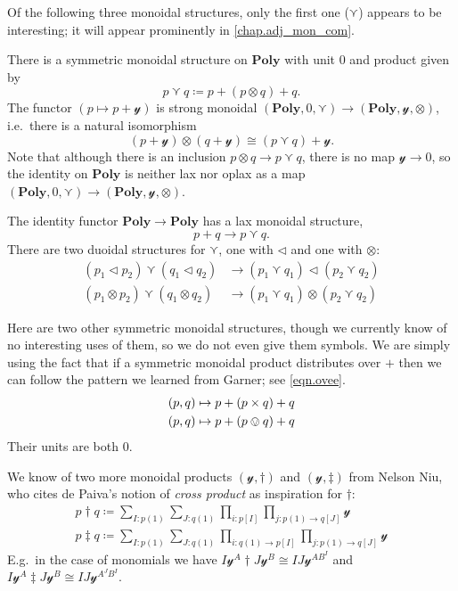 \documentclass[11pt, one side, article]{memoir}
\theoremstyle{definition}
\theoremstyle{plain}
\newcommand{\Cat}[1]{\mathbf{#1}}%
\newcommand{\yon}{{\mathcal{y}}}
\newcommand{\poly}{\Cat{Poly}}
\newcommand{\0}{\textsf{0}}
\newcommand{\1}{\tn{\textsf{1}}}
\newcommand{\tri}{\mathbin{\triangleleft}}
\newcommand{\OR}{\curlyvee}
\begin{document}
Of the following three monoidal structures, only the first one ($\OR$) appears to be interesting; it will appear prominently in \cref{chap.adj_mon_com}.

There is a symmetric monoidal structure on $\poly$ with unit $0$ and product given by
\begin{equation}\label{eqn.vee}
  p\OR q\coloneqq p+(p\otimes q)+q.
\end{equation}
The functor $(p\mapsto p+\yon)$ is strong monoidal $(\poly,0,\OR)\to(\poly,\yon,\otimes)$, i.e.\ there is a natural isomorphism
\begin{equation}
	(p+\yon)\otimes(q+\yon)\cong (p\OR q)+\yon.
\end{equation}
Note that although there is an inclusion $p\otimes q\to p\OR q$, there is no map $\yon\to0$, so the identity on $\poly$ is neither lax nor oplax as a map $(\poly,0,\OR)\to(\poly,\yon,\otimes)$.

The identity functor $\poly\to\poly$ has a lax monoidal structure,
\begin{equation}
	p+q\to p\OR q.
\end{equation}
There are two duoidal structures for $\OR$, one with $\tri$ and one with $\otimes$:
\begin{align*}
	(p_1\tri p_2)\OR(q_1\tri q_2)&\to(p_1\OR q_1)\tri(p_2\OR q_2)\\
	(p_1\otimes p_2)\OR(q_1\otimes q_2)&\to(p_1\OR q_1)\otimes(p_2\OR q_2)
\end{align*}

Here are two other symmetric monoidal structures, though we currently know of no interesting uses of them, so we do not even give them symbols. We are simply using the fact that if a symmetric monoidal product distributes over $+$ then we can follow the pattern we learned from Garner; see \eqref{eqn.ovee}.
\begin{align}
	(p,q)&\mapsto p+(p\times q)+q\\
	(p,q)&\mapsto p+(p\ovee q)+q
\end{align}
Their units are both $0$. 

We know of two more monoidal products $(\yon,\dagger)$ and $(\yon, \ddagger)$ from Nelson Niu, who cites de Paiva's notion of \emph{cross product} as inspiration for $\dagger$:
\begin{align}
	p\dagger q\coloneqq\sum_{I: p(1)}\sum_{J: q(1)}\prod_{i: p[I]}\prod_{j\colon p(1)\to q[J]}\yon\\
	p\ddagger q\coloneqq\sum_{I: p(1)}\sum_{J: q(1)}\prod_{i\colon q(1)\to p[I]}\prod_{j\colon p(1)\to q[J]}\yon
\end{align}
E.g.\ in the case of monomials we have $I\yon^A\dagger J\yon^B\cong IJ\yon^{AB^I}$ and $I\yon^A\ddagger J\yon^B\cong IJ\yon^{A^JB^I}$.
\end{document}
